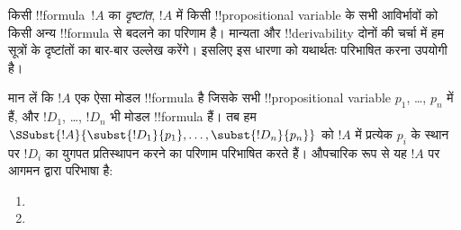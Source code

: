 \documentclass[../../../include/open-logic-section]{subfiles}
\begin{document}


किसी !!{formula}~$!A$ का \emph{दृष्टांत}, $!A$ में किसी !!{propositional variable}
के सभी आविर्भावों को किसी अन्य !!{formula} से बदलने का परिणाम है। मान्यता और
!!{derivability} दोनों की चर्चा में हम सूत्रों के दृष्टांतों का बार-बार
उल्लेख करेंगे। इसलिए इस धारणा को यथार्थतः परिभाषित करना उपयोगी है।

\begin{defn}
  मान लें कि $!A$ एक ऐसा मोडल !!{formula} है जिसके सभी !!{propositional variable}
  $p_1$, \dots, $p_n$ में हैं, और $!D_1$, \dots, $!D_n$ भी मोडल !!{formula}
  हैं। तब हम
  $\SSubst{!A}{\subst{!D_1}{p_1}, \dots, \subst{!D_n}{p_n}}$
  को $!A$ में प्रत्येक $p_i$ के स्थान पर $!D_i$ का युगपत प्रतिस्थापन करने
  का परिणाम परिभाषित करते हैं। औपचारिक रूप से यह $!A$ पर आगमन द्वारा
  परिभाषा है:
  \begin{enumerate}
    \item {}
    \item {}
\end{enumerate}
\end{defn}
\end{document}
